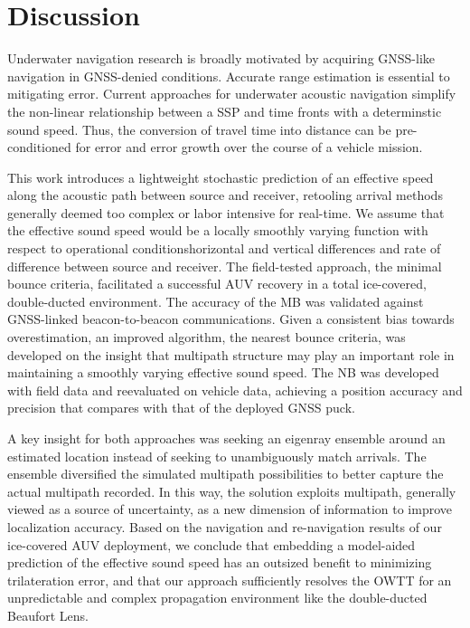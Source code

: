 \documentclass[preprint,TurnOnLineNumbers]{JASA}
\begin{document}
\clearpage
\section{Discussion}

Underwater navigation research is broadly motivated by acquiring GNSS-like navigation in GNSS-denied conditions.
Accurate range estimation is essential to mitigating error.
Current approaches for underwater acoustic navigation simplify the non-linear relationship between a SSP and time fronts with a determinstic sound speed.
Thus, the conversion of travel time into distance can be pre-conditioned for error and error growth over the course of a vehicle mission.

This work introduces a lightweight stochastic prediction of an effective speed along the acoustic path between source and receiver, retooling arrival methods generally deemed too complex or labor intensive for real-time.
We assume that the effective sound speed would be a locally smoothly varying function with respect to operational conditions\textemdash horizontal and vertical differences and rate of difference between source and receiver.
The field-tested approach, the minimal bounce criteria, facilitated a successful AUV recovery in a total ice-covered, double-ducted environment.
The accuracy of the MB was validated against GNSS-linked beacon-to-beacon communications.
Given a consistent bias towards overestimation, an improved algorithm, the nearest bounce criteria, was developed on the insight that multipath structure may play an important role in maintaining a smoothly varying effective sound speed.
The NB was developed with field data and reevaluated on vehicle data, achieving a position accuracy and precision that compares with that of the deployed GNSS puck.

A key insight for both approaches was seeking an eigenray ensemble around an estimated location instead of seeking to unambiguously match arrivals.
The ensemble diversified the simulated multipath possibilities to better capture the actual multipath recorded.
In this way, the solution exploits multipath, generally viewed as a source of uncertainty, as a new dimension of information to improve localization accuracy.
Based on the navigation and re-navigation results of our ice-covered AUV deployment, we conclude that embedding a model-aided prediction of the effective sound speed has an outsized benefit to minimizing trilateration error, and that our approach sufficiently resolves the OWTT for an unpredictable and complex propagation environment like the double-ducted Beaufort Lens.
\end{document}
